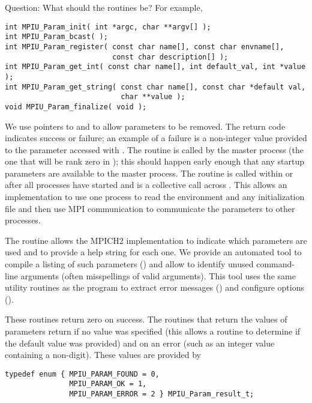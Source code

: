 \documentclass{article}
\begin{document}
Question: What should the routines be?  For 
example,%
%
\begin{verbatim}
int MPIU_Param_init( int *argc, char **argv[] );
int MPIU_Param_bcast( );
int MPIU_Param_register( const char name[], const char envname[], 
                         const char description[] );
int MPIU_Param_get_int( const char name[], int default_val, int *value );
int MPIU_Param_get_string( const char name[], const char *default val,
                           char **value );
void MPIU_Param_finalize( void );
\end{verbatim}
We use pointers to  and  to allow parameters to be
removed.  The return code indicates success or failure; an example of a
failure is a non-integer value provided to the parameter accessed with
. 
The routine  is called by the master process (the one
that will be rank zero in ); this should happen early
enough that any startup parameters are available to the master process.  The
routine  is called within  or
 after all processes have started and is a collective
call across .  This allows an implementation to use one
process to read the environment and any initialization file and then use MPI
communication to communicate the parameters to other processes.  

The routine  allows the MPICH2 implementation to
indicate which parameters are used and to provide a help string for each one.
We provide an automated tool to compile a listing of such parameters
() and
allow  to identify unused command-line arguments
(often misspellings of valid arguments).  This tool uses the same
utility routines as the program to extract error messages
() and configure options ().

These routines return zero on success.  The routines that return the values of
parameters return  if no value was specified (this
allows a routine to 
determine if the default value was provided) and
 on an error (such as an
integer value containing a non-digit).  These values are provided by
\begin{verbatim}
typedef enum { MPIU_PARAM_FOUND = 0, 
               MPIU_PARAM_OK = 1, 
               MPIU_PARAM_ERROR = 2 } MPIU_Param_result_t;
\end{verbatim}
\end{document}

